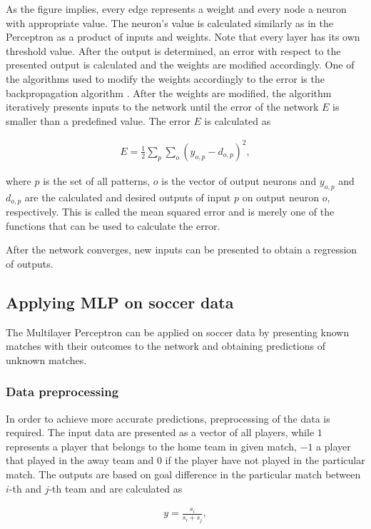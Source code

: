 As the figure implies, every edge represents a weight and every node a neuron with appropriate value. The neuron's value is calculated similarly as in the Perceptron as a product of inputs and weights. Note that every layer has its own threshold value. 
After the output is determined, an error with respect to the presented output is calculated and the weights are modified accordingly. One of the algorithms used to modify the weights accordingly to the error is the backpropagation algorithm \citep{RumelhartNeurocomputingFoundationsResearch1988}. After the weights are modified, the algorithm iteratively presents inputs to the network until the error of the network $E$ is smaller than a predefined value. The error $E$ is calculated as

\begin{align*}
E = \frac{1}{2}\sum_{p}\sum_{o}(y_{o,p} - d_{o,p})^2,
\end{align*}

\noindent where $p$ is the set of all patterns, $o$ is the vector of output neurons and $y_{o,p}$ and $d_{o,p}$ are the calculated and desired outputs of input $p$ on output neuron $o$, respectively. This is called the mean squared error and is merely one of the functions that can be used to calculate the error.

After the network converges, new inputs can be presented to obtain a regression of outputs.

\subsection{Applying MLP on soccer data}
The Multilayer Perceptron can be applied on soccer data by presenting known matches with their outcomes to the network and obtaining predictions of unknown matches.

\subsubsection{Data preprocessing}
In order to achieve more accurate predictions, preprocessing of the data is required. The input data are presented as a vector of all players, while $1$ represents a player that belongs to the home team in given match, $-1$ a player that played in the away team and $0$ if the player have not played in the particular match. The outputs are based on goal difference in the particular match between $i$-th and $j$-th team and are calculated as

\begin{align*}
y = \frac{s_i}{s_i + s_j},
\end{align*}


